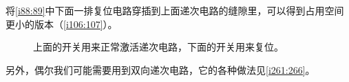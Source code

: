 将\autoref{i88:89}中下面一排复位电路穿插到上面递次电路的缝隙里，可以得到占用空间更小的版本（\autoref{i106:107}）。

\begin{figure}[!h]
\begin{center}
\end{center}
\caption{上面的开关用来正常激活递次电路，下面的开关用来复位。}
\label{i106:107}
\end{figure}

另外，偶尔我们可能需要用到双向递次电路，它的各种做法见\autoref{i261:266}。

